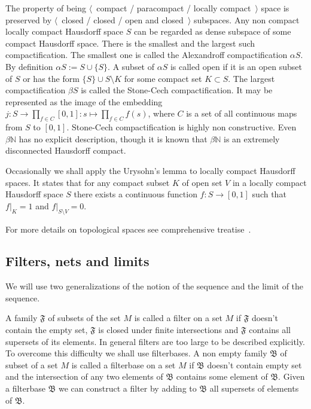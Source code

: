 The property of being $\langle$~compact / paracompact / locally
compact~$\rangle$ space is preserved by $\langle$~closed / closed / open and
closed~$\rangle$ subspaces. Any non compact locally compact Hausdorff space $S$
can be regarded as dense subspace of some compact Hausdorff space. There is the
smallest and the largest such compactification. The smallest one is called the
Alexandroff compactification $\alpha S$.  By definition 
$\alpha S:=S\cup  \{S \}$. 
A subset of $\alpha S$ is called open if it is an open subset of $S$ or has
the form $ \{S \}\cup S\setminus K$ for some compact set $K\subset S$. The
largest compactification $\beta S$ is called the Stone-Cech compactification. It
may be represented as the image of the embedding $j:S\to\prod_{f\in
C}[0,1]:s\mapsto \prod_{f\in C}f(s)$, where $C$ is a set of all continuous maps
from $S$ to $[0,1]$. Stone-Cech compactification is highly non constructive.
Even $\beta\mathbb{N}$ has no explicit description, though it is known that
$\beta\mathbb{N}$ is an extremely disconnected Hausdorff compact.

Occasionally we shall apply the Urysohn's lemma to locally compact Hausdorff
spaces. It states that for any compact subset $K$ of open set $V$ in a locally
compact Hausdorff space $S$ there exists a continuous function $f:S\to [0,1]$
such that $f|_K=1$ and $f|_{S\setminus V}=0$. 

For more details on topological spaces see comprehensive
treatise~\cite{EngelGenTop}. 


\subsection{Filters, nets and limits}\label{SubSectionFiltersNetsAndLimits} 

We will use two generalizations of the notion of the sequence and the limit of
the sequence.

A family $\mathfrak{F}$ of subsets of the set $M$ is called a filter on a set
$M$ if $\mathfrak{F}$ doesn't contain the empty set, $\mathfrak{F}$ is closed
under finite intersections and $\mathfrak{F}$ contains all supersets of its
elements. In general filters are too large to be described explicitly. To
overcome this difficulty we shall use filterbases. A non empty family
$\mathfrak{B}$ of subset of a set $M$ is called a filterbase on a set $M$ if
$\mathfrak{B}$ doesn't contain empty set and the intersection of any two
elements of $\mathfrak{B}$ contains some element of $\mathfrak{B}$. Given a
filterbase $\mathfrak{B}$ we can construct a filter by adding to $\mathfrak{B}$
all supersets of elements of $\mathfrak{B}$.

